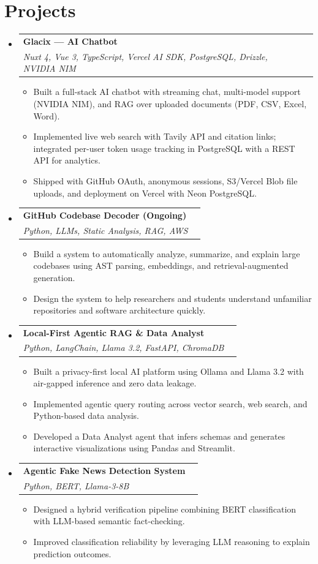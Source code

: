 \documentclass[letterpaper,11pt]{article}
\makeatletter
\newcommand{\resumeItem}[1]{\item\small{#1}}
\newcommand{\resumeSubheading}[4]{
  \item
  \begin{tabular*}{0.97\textwidth}{l@{\extracolsep{\fill}}r}
    \textbf{#1} & #2 \\
    \textit{\small#3} & \textit{\small #4} \\
  \end{tabular*}
}
\newcommand{\resumeSubHeadingListStart}{\begin{itemize}[leftmargin=0.15in, label={}]}
\newcommand{\resumeSubHeadingListEnd}{\end{itemize}}
\newcommand{\resumeItemListStart}{\begin{itemize}[leftmargin=0.30in, label=$\circ$, itemsep=0pt]}
\newcommand{\resumeItemListEnd}{\end{itemize}\vspace{-5pt}}
\makeatother
\begin{document}
\section{Projects}
\resumeSubHeadingListStart
  \resumeSubheading{Glacix — AI Chatbot}{}{\emph{Nuxt 4, Vue 3, TypeScript, Vercel AI SDK, PostgreSQL, Drizzle, NVIDIA NIM}}{}
  \resumeItemListStart
    \resumeItem{Built a full-stack AI chatbot with streaming chat, multi-model support (NVIDIA NIM), and RAG over uploaded documents (PDF, CSV, Excel, Word).}
    \resumeItem{Implemented live web search with Tavily API and citation links; integrated per-user token usage tracking in PostgreSQL with a REST API for analytics.}
    \resumeItem{Shipped with GitHub OAuth, anonymous sessions, S3/Vercel Blob file uploads, and deployment on Vercel with Neon PostgreSQL.}
  \resumeItemListEnd
  \resumeSubheading{GitHub Codebase Decoder (Ongoing)}{}{\emph{Python, LLMs, Static Analysis, RAG, AWS}}{}
  \resumeItemListStart
    \resumeItem{Build a system to automatically analyze, summarize, and explain large codebases using AST parsing, embeddings, and retrieval-augmented generation.}
    \resumeItem{Design the system to help researchers and students understand unfamiliar repositories and software architecture quickly.}
  \resumeItemListEnd
  \resumeSubheading{Local-First Agentic RAG \& Data Analyst}{}{\emph{Python, LangChain, Llama 3.2, FastAPI, ChromaDB}}{}
  \resumeItemListStart
    \resumeItem{Built a privacy-first local AI platform using Ollama and Llama 3.2 with air-gapped inference and zero data leakage.}
    \resumeItem{Implemented agentic query routing across vector search, web search, and Python-based data analysis.}
    \resumeItem{Developed a Data Analyst agent that infers schemas and generates interactive visualizations using Pandas and Streamlit.}
  \resumeItemListEnd
  \resumeSubheading{Agentic Fake News Detection System}{}{\emph{Python, BERT, Llama-3-8B}}{}
  \resumeItemListStart
    \resumeItem{Designed a hybrid verification pipeline combining BERT classification with LLM-based semantic fact-checking.}
    \resumeItem{Improved classification reliability by leveraging LLM reasoning to explain prediction outcomes.}
  \resumeItemListEnd
\resumeSubHeadingListEnd
\end{document}
